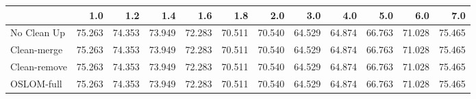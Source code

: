 \begin{tabular}{lrrrrrrrrrrr}
\toprule
{} &    1.0 &    1.2 &    1.4 &    1.6 &    1.8 &    2.0 &    3.0 &    4.0 &    5.0 &    6.0 &    7.0 \\
\midrule
No Clean Up  & 75.263 & 74.353 & 73.949 & 72.283 & 70.511 & 70.540 & 64.529 & 64.874 & 66.763 & 71.028 & 75.465 \\
Clean-merge  & 75.263 & 74.353 & 73.949 & 72.283 & 70.511 & 70.540 & 64.529 & 64.874 & 66.763 & 71.028 & 75.465 \\
Clean-remove & 75.263 & 74.353 & 73.949 & 72.283 & 70.511 & 70.540 & 64.529 & 64.874 & 66.763 & 71.028 & 75.465 \\
OSLOM-full   & 75.263 & 74.353 & 73.949 & 72.283 & 70.511 & 70.540 & 64.529 & 64.874 & 66.763 & 71.028 & 75.465 \\
\bottomrule
\end{tabular}
